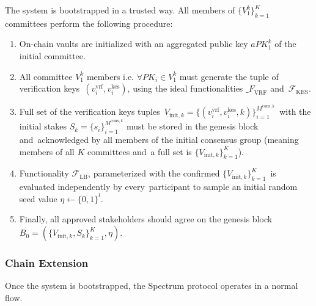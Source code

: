The system is bootstrapped in a trusted way.
All members of $\{V^k_1\}_{k=1}^K$ committees perform the following procedure:
\begin{enumerate}
    \item On-chain vaults are initialized with an aggregated public key $aPK^k_1$ of the initial committee.

    \item All committee $V^k_1$ members i.e. ${\forall PK_i \in V^k_1}$ must generate the tuple of verification keys\
    ${(v_i^{\text{vrf}}, v_i^{\text{kes}})}$, using the ideal functionalities ${\mathcal_{F}}_{\text{VRF}}$ and\
    ${\mathcal{F}}_{\text{KES}}$.

    \item Full set of the verification keys tuples\
    ${V_{\text{init}, k} = \{(v_i^{\text{vrf}}, v_i^{\text{kes}}, k)\}_{i=1}^{M^{\text{cons}, k}}}$\
    with the initial stakes $S_k = \{s_i\}_{i=1}^{M^{\text{cons}, k}}$ must be stored in the genesis block and\
    acknowledged by all members of the initial consensus group (meaning members of all $K$ committees and\
    a full set is $\{V_{\text{init}, k}\}_{k=1}^{K}$).

    \item Functionality ${\mathcal{F}}_{\text{LB}}$, parameterized with the confirmed $\{V_{\text{init}, k}\}_{k=1}^{K}$\
    is evaluated independently by every\
    participant to sample an initial random seed value $\eta \leftarrow \{0, 1\}^l$.

    \item Finally, all approved stakeholders should agree on the genesis block\
    ${B_0=\left(\{V_{\text{init}, k}, S_k\}_{k=1}^{K}, \eta\right)}$.
\end{enumerate}

\subsubsection{Chain Extension}\label{subsubsec:chain-extension}
Once the system is bootstrapped, the Spectrum protocol operates in a normal flow.

